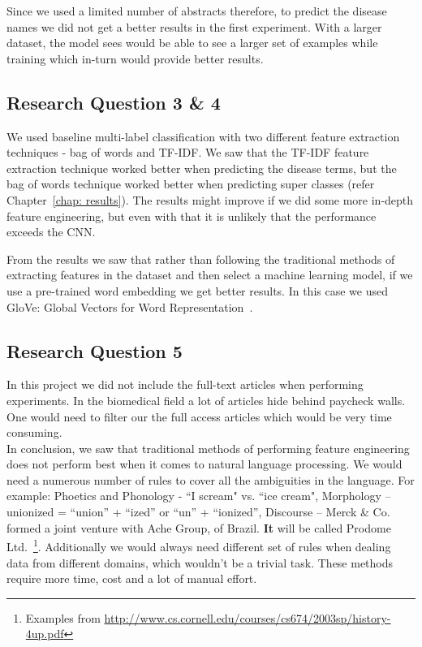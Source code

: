 Since we used a limited number of abstracts therefore, to predict the disease names we did not get a better results in the first experiment. With a larger dataset, the model sees would be able to see a larger set of examples while training which in-turn would provide better results.

\subsection{Research Question 3 \& 4}
We used baseline multi-label classification with two different feature extraction techniques - bag of words and TF-IDF. We saw that the TF-IDF feature extraction technique worked better when predicting the disease terms, but the bag of words technique worked better when predicting super classes (refer Chapter~\ref{chap: results}). The results might improve if we did some more in-depth feature engineering, but even with that it is unlikely that the performance exceeds the CNN.

From the results we saw that rather than following the traditional methods of extracting features in the dataset and then select a machine learning model, if we use a pre-trained word embedding we get better results. In this case we used GloVe: Global Vectors for Word Representation~\cite{pennington2014glove}. 

\subsection{Research Question 5}
In this project we did not include the full-text articles when performing experiments. In the biomedical field a lot of articles hide behind paycheck walls. One would need to filter our the full access articles which would be very time consuming.  
\\

In conclusion, we saw that traditional methods of performing feature engineering does not perform best when it comes to natural language processing. We would need a numerous number of rules to cover all the ambiguities in the language. For example: Phoetics and Phonology - ``I scream" vs. ``ice cream", Morphology -- unionized = ``union” + ``ized” or ``un” + ``ionized”, Discourse -- Merck \& Co. formed a joint venture with Ache Group, of Brazil. \textbf{It}
will be called Prodome Ltd.~\footnote{Examples from \url{http://www.cs.cornell.edu/courses/cs674/2003sp/history-4up.pdf}}. 
Additionally we would always need different set of rules when dealing data from different domains, which wouldn't be a trivial task. These methods require more time, cost and a lot of manual effort. 

